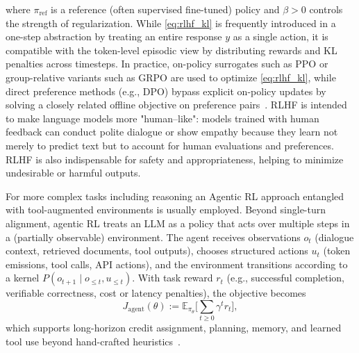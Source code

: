 \documentclass{article}
\numberwithin{equation}{section}
\newcommand{\E}{\mathbb E}
\begin{document}
where $\pi_{\mathrm{ref}}$ is a reference (often supervised fine-tuned) policy and $\beta>0$ controls the strength of regularization. While \eqref{eq:rlhf_kl} is frequently introduced in a one-step abstraction by treating an entire response $y$ as a single action, it is compatible with the token-level episodic view by distributing rewards and KL penalties across timesteps.
In practice, on-policy surrogates such as PPO or group-relative variants such as GRPO are used to optimize \eqref{eq:rlhf_kl}, while direct preference methods (e.g., DPO) bypass explicit on-policy updates by solving a closely related offline objective on preference pairs~\cite{ding2026rgdpo,yin2026rewardupdatedgrpo,liu2026regrpo,zhang2025landscape}. RLHF is intended  to make language models more "human--like": models trained with human feedback can conduct polite dialogue or show empathy because they learn not merely to predict text but to account for human evaluations and preferences. RLHF is also indispensable for safety and appropriateness, helping to minimize undesirable or harmful outputs.

For more complex tasks including reasoning an Agentic RL approach entangled with tool-augmented environments is usually employed. Beyond single-turn alignment, agentic RL treats an LLM as a policy that acts over multiple steps in a (partially observable) environment. The agent receives observations $o_t$ (dialogue context, retrieved documents, tool outputs), chooses structured actions $u_t$ (token emissions, tool calls, API actions), and the environment transitions according to a kernel $P(o_{t+1}\mid o_{\le t},u_{\le t})$. With task reward $r_t$ (e.g., successful completion, verifiable correctness, cost or latency penalties), the objective becomes
\begin{equation}\label{eq:agentic_objective}
J_{\mathrm{agent}}(\theta):=\E_{\pi_\theta}\Big[\sum_{t\ge 0}\gamma^t r_t\Big],
\end{equation}
which supports long-horizon credit assignment, planning, memory, and learned tool use beyond hand-crafted heuristics~\cite{arulkumaran2017drlsurvey,zhang2025landscape}.
\end{document}
